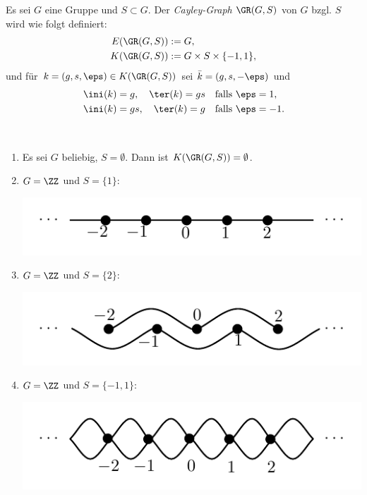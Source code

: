 \DB Es sei $G$ eine Gruppe und $S\subset G$.
Der \emph{Cayley-Graph}
$\GR(G,S)$ von $G$ bzgl. $S$ wird wie folgt definiert:
\begin{align*}
E(\GR(G,S)) &:= G, \\
K(\GR(G,S)) &:= G \times S \times \{-1,1\},
\end{align*}
und für $k=(g,s,\eps)\in K(\GR(G,S))$ sei $\bar{k}=(g,s,-\eps)$
und
\begin{align*}
&\ini(k) = g, \quad \ter(k) = gs \quad \text{falls } \eps = 1, \\
&\ini(k) = gs, \quad \ter(k) = g \quad \text{falls } \eps = -1.
\end{align*}

\BSP\label{bsp_cay}\
\begin{enumerate}
\item Es sei $G$ beliebig, $S=\emptyset$.
Dann ist $K(\GR(G,S))=\emptyset$.
\item $G=\ZZ$ und $S=\{1\}$:
\begin{center}
	\includegraphics{grugraImages/cay1}
\end{center}
\item $G=\ZZ$ und $S=\{2\}$:
\begin{center}
	\includegraphics{grugraImages/cay3}
\end{center}
\item $G=\ZZ$ und $S=\{-1,1\}$:
\begin{center}
	\includegraphics{grugraImages/cay2}
\end{center}

\end{enumerate}
